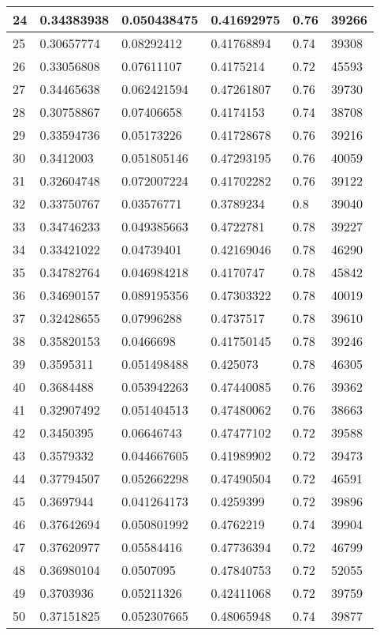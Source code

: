 \begin{longtable}{|l|l|l|l|l|l|}
24 & 0.34383938 & 0.050438475 & 0.41692975 & 0.76 & 39266 \\ \hline 
25 & 0.30657774 & 0.08292412 & 0.41768894 & 0.74 & 39308 \\ \hline 
26 & 0.33056808 & 0.07611107 & 0.4175214 & 0.72 & 45593 \\ \hline 
27 & 0.34465638 & 0.062421594 & 0.47261807 & 0.76 & 39730 \\ \hline 
28 & 0.30758867 & 0.07406658 & 0.4174153 & 0.74 & 38708 \\ \hline 
29 & 0.33594736 & 0.05173226 & 0.41728678 & 0.76 & 39216 \\ \hline 
30 & 0.3412003 & 0.051805146 & 0.47293195 & 0.76 & 40059 \\ \hline 
31 & 0.32604748 & 0.072007224 & 0.41702282 & 0.76 & 39122 \\ \hline 
32 & 0.33750767 & 0.03576771 & 0.3789234 & 0.8 & 39040 \\ \hline 
33 & 0.34746233 & 0.049385663 & 0.4722781 & 0.78 & 39227 \\ \hline 
34 & 0.33421022 & 0.04739401 & 0.42169046 & 0.78 & 46290 \\ \hline 
35 & 0.34782764 & 0.046984218 & 0.4170747 & 0.78 & 45842 \\ \hline 
36 & 0.34690157 & 0.089195356 & 0.47303322 & 0.78 & 40019 \\ \hline 
37 & 0.32428655 & 0.07996288 & 0.4737517 & 0.78 & 39610 \\ \hline 
38 & 0.35820153 & 0.0466698 & 0.41750145 & 0.78 & 39246 \\ \hline 
39 & 0.3595311 & 0.051498488 & 0.425073 & 0.78 & 46305 \\ \hline 
40 & 0.3684488 & 0.053942263 & 0.47440085 & 0.76 & 39362 \\ \hline 
41 & 0.32907492 & 0.051404513 & 0.47480062 & 0.76 & 38663 \\ \hline 
42 & 0.3450395 & 0.06646743 & 0.47477102 & 0.72 & 39588 \\ \hline 
43 & 0.3579332 & 0.044667605 & 0.41989902 & 0.72 & 39473 \\ \hline 
44 & 0.37794507 & 0.052662298 & 0.47490504 & 0.72 & 46591 \\ \hline 
45 & 0.3697944 & 0.041264173 & 0.4259399 & 0.72 & 39896 \\ \hline 
46 & 0.37642694 & 0.050801992 & 0.4762219 & 0.74 & 39904 \\ \hline 
47 & 0.37620977 & 0.05584416 & 0.47736394 & 0.72 & 46799 \\ \hline 
48 & 0.36980104 & 0.0507095 & 0.47840753 & 0.72 & 52055 \\ \hline 
49 & 0.3703936 & 0.05211326 & 0.42411068 & 0.72 & 39759 \\ \hline 
50 & 0.37151825 & 0.052307665 & 0.48065948 & 0.74 & 39877 \\ \hline 
\end{longtable}